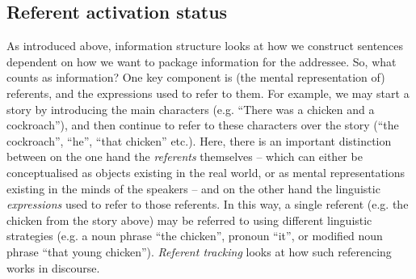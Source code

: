 \documentclass[output=paper]{langscibook}
\begin{document}
\subsection{Referent activation status}

As introduced above, information structure looks at how we construct sentences dependent on how we want to package information for the addressee. So, what counts as information? One key component is (the mental representation of) referents, and the expressions used to refer to them. For example, we may start a story by introducing the main characters (e.g. “There was a chicken and a cockroach”), and then continue to refer to these characters over the story (“the cockroach”, “he”, “that chicken” etc.). Here, there is an important distinction between on the one hand the \textit{referents} themselves – which can either be conceptualised as objects existing in the real world, or as mental representations existing in the minds of the speakers – and on the other hand the linguistic \textit{expressions} used to refer to those referents. In this way, a single referent (e.g. the chicken from the story above) may be referred to using different linguistic strategies (e.g. a noun phrase “the chicken”, pronoun “it”, or modified noun phrase “that young chicken”). \textit{Referent tracking} looks at how such referencing works in discourse.
\end{document}
